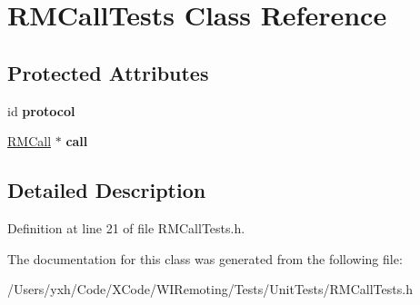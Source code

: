\hypertarget{interface_r_m_call_tests}{
\section{RMCallTests Class Reference}
\label{interface_r_m_call_tests}
}
\subsection*{Protected Attributes}
\begin{DoxyCompactItemize}
\item 
\hypertarget{interface_r_m_call_tests_a09775bdf02a3dd357630f87e2263a055}{
id {\bfseries protocol}}
\label{interface_r_m_call_tests_a09775bdf02a3dd357630f87e2263a055}

\item 
\hypertarget{interface_r_m_call_tests_acf178ef7ba187366a43cf708ba587051}{
\hyperlink{interface_r_m_call}{RMCall} $\ast$ {\bfseries call}}
\label{interface_r_m_call_tests_acf178ef7ba187366a43cf708ba587051}

\end{DoxyCompactItemize}


\subsection{Detailed Description}


Definition at line 21 of file RMCallTests.h.

The documentation for this class was generated from the following file:\begin{DoxyCompactItemize}
\item 
/Users/yxh/Code/XCode/WIRemoting/Tests/UnitTests/RMCallTests.h\end{DoxyCompactItemize}
